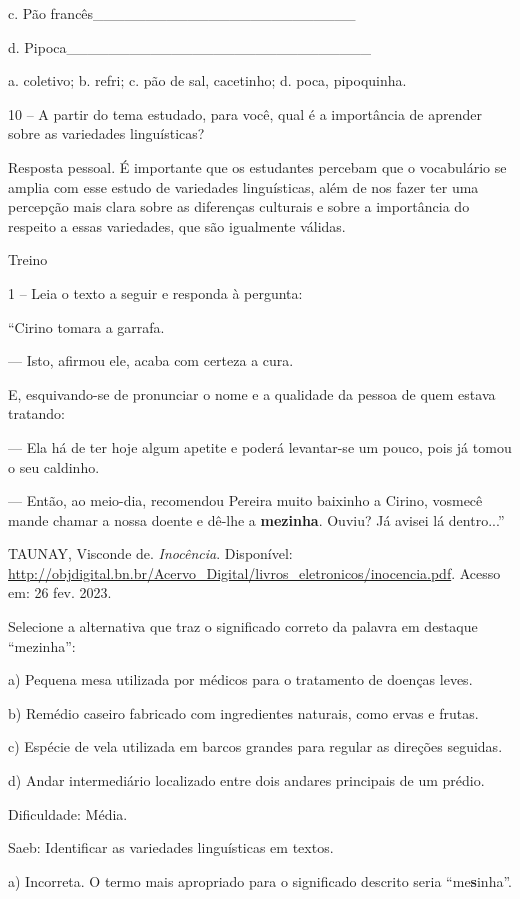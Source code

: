 c. Pão francês\_\_\_\_\_\_\_\_\_\_\_\_\_\_\_\_\_\_\_\_\_\_\_\_\_

d. Pipoca\_\_\_\_\_\_\_\_\_\_\_\_\_\_\_\_\_\_\_\_\_\_\_\_\_\_\_\_\_

a. coletivo; b. refri; c. pão de sal, cacetinho; d. poca, pipoquinha.

10 -- A partir do tema estudado, para você, qual é a importância de
aprender sobre as variedades linguísticas?

Resposta pessoal. É importante que os estudantes percebam que o
vocabulário se amplia com esse estudo de variedades linguísticas, além
de nos fazer ter uma percepção mais clara sobre as diferenças culturais
e sobre a importância do respeito a essas variedades, que são igualmente
válidas.

Treino

1 -- Leia o texto a seguir e responda à pergunta:

``Cirino tomara a garrafa.

--- Isto, afirmou ele, acaba com certeza a cura.

E, esquivando-se de pronunciar o nome e a qualidade da pessoa de quem
estava tratando:

--- Ela há de ter hoje algum apetite e poderá levantar-se um pouco, pois
já tomou o seu caldinho.

--- Então, ao meio-dia, recomendou Pereira muito baixinho a Cirino,
vosmecê mande chamar a nossa doente e dê-lhe a \textbf{mezinha}. Ouviu?
Já avisei lá dentro...''

TAUNAY, Visconde de. \emph{Inocência}. Disponível:
\url{http://objdigital.bn.br/Acervo_Digital/livros_eletronicos/inocencia.pdf}.
Acesso em: 26 fev. 2023.

Selecione a alternativa que traz o significado correto da palavra em
destaque ``mezinha'':

a) Pequena mesa utilizada por médicos para o tratamento de doenças
leves.

b) Remédio caseiro fabricado com ingredientes naturais, como ervas e
frutas.

c) Espécie de vela utilizada em barcos grandes para regular as direções
seguidas.

d) Andar intermediário localizado entre dois andares principais de um
prédio.

Dificuldade: Média.

Saeb: Identificar as variedades linguísticas em textos.

a) Incorreta. O termo mais apropriado para o significado descrito seria
``me\textbf{s}inha''.

